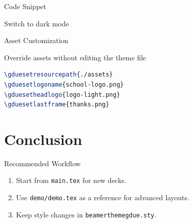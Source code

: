 \documentclass[10pt,aspectratio=169]{beamer}
\begin{document}
\begin{frame}[fragile]{Code Snippet}
\begin{codeblock}[language=TeX]{Switch to dark mode}
\end{codeblock}
\end{frame}

\begin{frame}[fragile]{Asset Customization}
\begin{block}{Override assets without editing the theme file}
\begin{lstlisting}[language=TeX]
\gduesetresourcepath{./assets}
\gduesetlogoname{school-logo.png}
\gduesetheadlogo{logo-light.png}
\gduesetlastframe{thanks.png}
\end{lstlisting}
\end{block}
\end{frame}

\section{Conclusion}

\begin{frame}{Recommended Workflow}
\begin{enumerate}
  \item Start from \texttt{main.tex} for new decks.
  \item Use \texttt{demo/demo.tex} as a reference for advanced layouts.
  \item Keep style changes in \texttt{beamerthemegdue.sty}.
\end{enumerate}
\end{frame}

\backmatter
\end{document}
